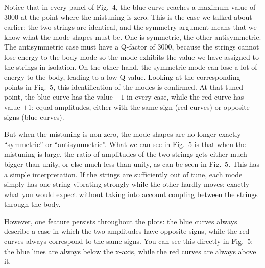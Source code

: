 
  Notice that in every panel of Fig.\ 4, the blue curve reaches a maximum value 
  of 3000 at the point where the mistuning is zero. This is the case we talked 
  about earlier: the two strings are identical, and the symmetry argument means 
  that we know what the mode shapes must be. One is symmetric, the other 
  antisymmetric. The antisymmetric case must have a Q-factor of 3000, because 
  the strings cannot lose energy to the body mode so the mode exhibits the 
  value we have assigned to the strings in isolation. On the other hand, the 
  symmetric mode can lose a lot of energy to the body, leading to a low 
  Q-value. Looking at the corresponding points in Fig.\ 5, this identification 
  of the modes is confirmed. At that tuned point, the blue curve has the value 
  $-1$ in every case, while the red curve has value $+1$: equal amplitudes, 
  either with the same sign (red curves) or opposite signs (blue curves). 


  

  But when the mistuning is non-zero, the mode shapes are no longer exactly 
  ``symmetric'' or ``antisymmetric''. What we can see in Fig.\ 5 is that when 
  the mistuning is large, the ratio of amplitudes of the two strings gets 
  either much bigger than unity, or else much less than unity, as can be seen 
  in Fig.\ 5. This has a simple interpretation. If the strings are sufficiently 
  out of tune, each mode simply has one string vibrating strongly while the 
  other hardly moves: exactly what you would expect without taking into account 
  coupling between the strings through the body. 

  However, one feature persists throughout the plots: the blue curves always 
  describe a case in which the two amplitudes have opposite signs, while the 
  red curves always correspond to the same signs. You can see this directly in 
  Fig.\ 5: the blue lines are always below the x-axis, while the red curves are 
  always above it. 

